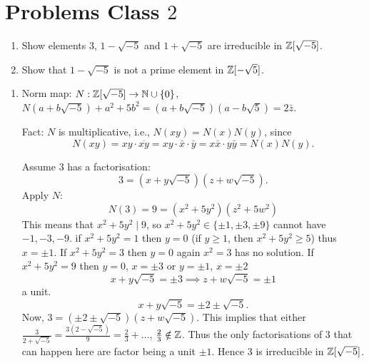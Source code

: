 \documentclass[10pt, a4paper]{article}
\begin{document}
\newpage

\section{Problems Class \texorpdfstring{$2$}{}}

\begin{problem}[Question $6$]
    \begin{enumerate}[label = (\alph*)]
        \item Show elements $3$,
        $1 - \sqrt{-5}$ and $1 + \sqrt{-5}$ are irreducible in $\mathbb{Z}[\sqrt{-5}]$.

        \item Show that $1 - \sqrt{-5}$ is not a prime element in $\mathbb{Z}[-\sqrt{5}]$.
    \end{enumerate}

    \begin{solution}
        \begin{enumerate}[label = (\alph*)]
            \item
            Norm map:
            $N : \mathbb{Z}[\sqrt{-5}] \to \mathbb{N} \cup \{0\}$,
            $N(a + b\sqrt{-5}) + a ^ 2 + 5b ^ 2 = (a + b\sqrt{-5})(a - b\sqrt{5}) = 2\bar{z}$.

            Fact:
            $N$ is multiplicative,
            i.e.,
            $N(xy) = N(x)N(y)$,
            since
            \[
            N(xy) = xy\cdot \overline{xy} = xy \cdot \bar{x} \cdot \bar{y} = x\bar{x} \cdot y\bar{y} = N(x)N(y).
            \]

            Assume $3$ has a factorisation:
            \[
            3 = (x + y\sqrt{-5})(z + w\sqrt{-5}).
            \]
            Apply $N$:
            \[
            N(3) = 9 = (x ^ 2 + 5y ^ 2)(z ^ 2 + 5w ^ 2)
            \]
            This means that $x ^ 2 + 5y ^ 2 \mid 9$,
            so $x ^ 2 + 5y ^ 2 \in \{\pm 1, \pm 3, \pm 9\}$ cannot have $-1, -3, -9$.
            if $x ^ 2 + 5y ^ 2 = 1$ then $y = 0$
            (if $y \geq 1$,
            then $x ^ 2 + 5y ^ 2 \geq 5$)
            thus $x = \pm 1$.
            If $x ^ 2 + 5y ^ 2 = 3$ then $y = 0$ again $x ^ 2 = 3$ has no solution.
            If $x ^ 2 + 5y ^ 2 = 9$ then $y = 0$,
            $x = \pm 3$ or $y = \pm 1$,
            $x = \pm 2$
            \[
            x + y\sqrt{-5} = \pm 3 \implies z + w\sqrt{-5} = \pm 1
            \]
            a unit.
            \[
            x + y\sqrt{-5} = \pm 2 \pm \sqrt{-5}.
            \]
            Now,
            $3 = (\pm 2 \pm \sqrt{-5})(z + w\sqrt{-5})$.
            This implies that either $\frac{3}{2 + \sqrt{-5}} = \frac{3(2 - \sqrt{-5})}{9} = \frac{2}{3} + \dotsc$,
            $\frac{2}{3} \notin \mathbb{Z}$.
            Thus the only factorisations of $3$ that can happen here are factor being a unit $\pm 1$.
            Hence $3$ is irreducible in $\mathbb{Z}[\sqrt{-5}]$.
        \end{enumerate}
    \end{solution}
\end{problem}
\end{document}
